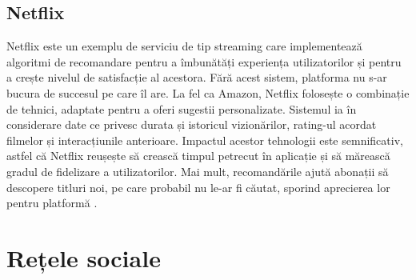 \subsection*{Netflix}
Netflix este un exemplu de serviciu de tip streaming care implementează algoritmi de recomandare pentru a îmbunătăți experiența utilizatorilor și pentru a crește nivelul de satisfacție al acestora.
Fără acest sistem, platforma nu s-ar bucura de succesul pe care îl are.
La fel ca Amazon, Netflix folosește o combinație de tehnici, adaptate pentru a oferi sugestii personalizate. 
Sistemul ia în considerare date ce privesc durata și istoricul vizionărilor, rating-ul acordat filmelor și interacțiunile anterioare.
Impactul acestor tehnologii este semnificativ, astfel că Netflix reușește să crească timpul petrecut în aplicație și să mărească gradul de fidelizare a utilizatorilor.
Mai mult, recomandările ajută abonații să descopere titluri noi, pe care probabil nu le-ar fi căutat, sporind aprecierea lor pentru platformă \cite{chiny2022netflix, gomez2015netflix}.

\section{Rețele sociale}
\label{sec:ch2sec2}
